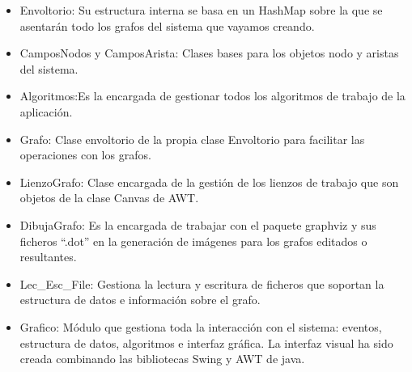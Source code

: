 \documentclass[xcolor=x11names,compress]{beamer}
\theoremstyle{cuadrado}
\begin{document}
{{\begin{itemize}
\item Envoltorio: Su estructura interna se basa en un HashMap sobre la que se asentarán todo los grafos del sistema que vayamos creando.
\item CamposNodos y CamposArista: Clases bases para los objetos nodo y aristas del sistema.
\item Algoritmos:Es la encargada de gestionar todos los algoritmos de trabajo de la aplicación.
\item Grafo: Clase envoltorio de la propia clase Envoltorio para facilitar las operaciones con los grafos.
\item LienzoGrafo: Clase encargada de la gestión de los lienzos de trabajo que son objetos de la clase Canvas de AWT.
\item DibujaGrafo: Es la encargada de trabajar con el paquete graphviz y sus ficheros ``.dot'' en la generación de imágenes para los grafos editados o resultantes.
\item Lec\_Esc\_File: Gestiona la lectura y escritura de ficheros que soportan la estructura de datos e información sobre el grafo.
\item Grafico: Módulo que gestiona toda la interacción con el sistema: eventos, estructura de datos, algoritmos e interfaz gráfica. La interfaz visual ha sido creada combinando las bibliotecas Swing y AWT de java.
\end{itemize}

}


}
\end{document}
